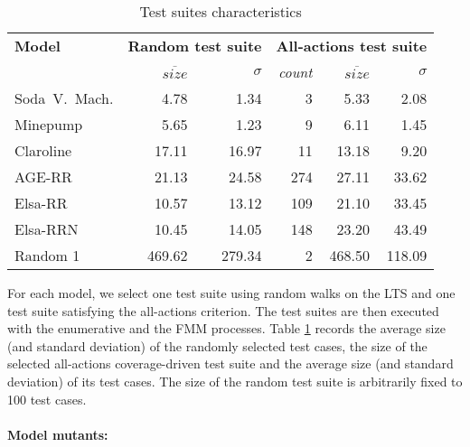 \begin{table}
\centering
\caption{Test suites characteristics}
\begin{small}
\begin{tabular}{l r r r r r}
\hline
\textbf{Model}	& \multicolumn{2}{c}{\textbf{Random test suite}}	& \multicolumn{3}{c}{\textbf{All-actions test suite}}	\\
	& \textit{$\overline{size}$} & \textit{$\sigma$}	& \textit{count} & \textit{$\overline{size}$} & \textit{$\sigma$}	 \\
\hline 
Soda~V.~Mach.	& 4.78 	& 1.34 	& 3 		& 5.33 	& 2.08 \\
Minepump			& 5.65 	& 1.23 	& 9 		& 6.11 	& 1.45 \\
Claroline		& 17.11 	& 16.97 	& 11 	& 13.18 	& 9.20 \\
AGE-RR			& 21.13 	& 24.58 	& 274 	& 27.11 	& 33.62 \\
Elsa-RR			& 10.57 	& 13.12 	& 109 	& 21.10 	& 33.45 \\
Elsa-RRN			& 10.45 	& 14.05 	& 148 	& 23.20 	& 43.49 \\
Random 1 			& 469.62	& 279.34	& 2 		& 468.50	& 118.09 \\
\hline
\end{tabular}
\end{small}
\label{tab:experiment:fmmexec:testsets}
\end{table}

For each model, we select one test suite using random walks on the LTS and one test suite satisfying the all-actions criterion.
The test suites are then executed with the enumerative and the FMM processes. Table \ref{tab:experiment:fmmexec:testsets} records the average size (and standard deviation) of the randomly selected test cases, the size of the selected all-actions coverage-driven test suite and the average size (and standard deviation) of its test cases. The size of the random test suite is arbitrarily fixed to 100 test cases. 

\paragraph{Model mutants:}

